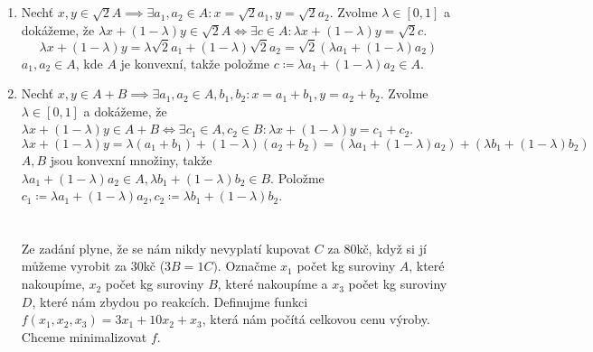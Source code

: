 \documentclass[12pt, a4paper]{article}
\begin{document}
\section{}
\begin{enumerate}
\item Nechť $x,y \in \sqrt{2}A \implies \exists a_1,a_2 \in A: x=\sqrt{2}a_1, y = \sqrt{2}a_2$. Zvolme $\lambda \in [0,1]$ a dokážeme, že $\lambda x + (1-\lambda)y \in \sqrt{2}A \iff \exists c \in A : \lambda x + (1-\lambda)y = \sqrt{2}c$.
\[
\lambda x + (1-\lambda)y = \lambda \sqrt{2}a_1 + (1-\lambda)\sqrt{2}a_2 = \sqrt{2}(\lambda a_1 + (1-\lambda)a_2)
\]
$a_1,a_2 \in A$, kde $A$ je konvexní, takže položme $c \coloneqq \lambda a_1 + (1-\lambda)a_2 \in A$.
\item Nechť $x,y \in A+B \implies \exists a_1,a_2 \in A, b_1,b_2: x=a_1+b_1, y = a_2+b_2$. Zvolme $\lambda \in [0,1]$ a dokážeme, že $\lambda x + (1-\lambda)y \in A+B \iff \exists c_1 \in A, c_2 \in B: \lambda x + (1-\lambda)y = c_1 + c_2$.
\[
\lambda x + (1-\lambda)y= \lambda (a_1+b_1) + (1-\lambda)(a_2+b_2) = (\lambda a_1 + (1-\lambda)a_2) + (\lambda b_1 + (1-\lambda)b_2)
\]
$A,B$ jsou konvexní množiny, takže $\lambda a_1 + (1-\lambda)a_2 \in A, \lambda b_1 + (1-\lambda)b_2 \in B$. Položme $c_1 \coloneqq \lambda a_1 + (1-\lambda)a_2, c_2 \coloneqq \lambda b_1 + (1-\lambda)b_2$.

\section{}
Ze zadání plyne, že se nám nikdy nevyplatí kupovat $C$ za 80kč, když si jí můžeme vyrobit za 30kč ($3B = 1C)$. Označme $x_1$ počet kg suroviny $A$, které nakoupíme, $x_2$ počet kg suroviny $B$, které nakoupíme a $x_3$ počet kg suroviny $D$, které nám zbydou po reakcích. Definujme funkci $f(x_1,x_2,x_3) = 3x_1+10x_2+x_3$, která nám počítá celkovou cenu výroby. Chceme minimalizovat $f$.
\end{enumerate}
\end{document}
